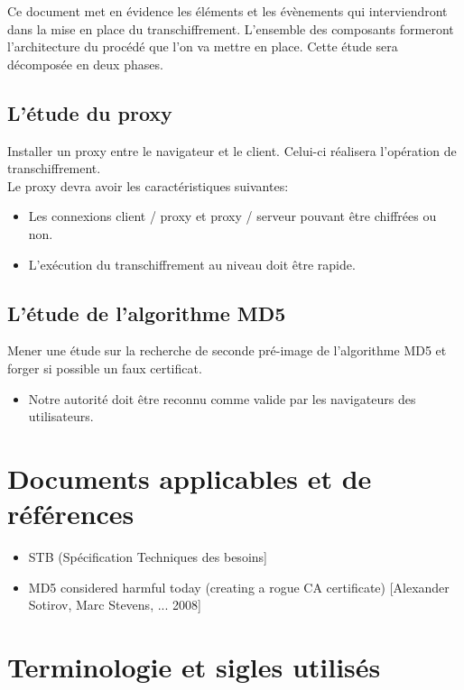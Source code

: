 \documentclass[a4paper,11pt,french]{article}
\begin{document}
Ce document met en évidence les éléments et les évènements qui interviendront dans la mise en place du transchiffrement. L'ensemble des composants formeront l'architecture du procédé que l'on va mettre en place. Cette étude sera décomposée en deux phases.  
\subsection{L'étude du proxy}
Installer un proxy entre le navigateur et le client. Celui-ci réalisera l'opération de transchiffrement.  \\
Le proxy devra avoir les caractéristiques suivantes:
\begin{itemize}
\item Les connexions client / proxy et proxy / serveur pouvant être  chiffrées ou non.
\item L'exécution du transchiffrement au niveau doit être rapide.
\end{itemize}

\subsection{L'étude de l'algorithme MD5}
Mener une étude sur la recherche de seconde pré-image de l'algorithme MD5 et forger si possible un faux certificat.  \\ 
\begin{itemize}
\item Notre autorité doit être reconnu comme valide par les navigateurs des utilisateurs.
\end{itemize}
\section{Documents applicables et de références}
\begin{itemize}
\item STB (Spécification Techniques des besoins]
\item MD5 considered harmful today (creating a rogue CA certificate) [Alexander Sotirov, Marc Stevens, ... 2008]
\end{itemize}


\section{Terminologie et sigles utilisés}
\end{document}
